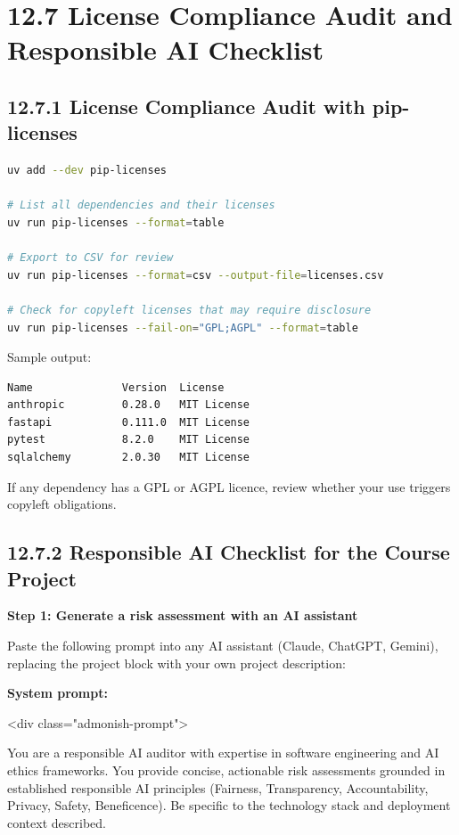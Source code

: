 \documentclass[11pt,a4paper]{book}
\begin{document}
\medskip

\section{12.7 License Compliance Audit and Responsible AI Checklist}

\subsection{12.7.1 License Compliance Audit with pip-licenses}

\begin{lstlisting}[language=Bash]
uv add --dev pip-licenses

# List all dependencies and their licenses
uv run pip-licenses --format=table

# Export to CSV for review
uv run pip-licenses --format=csv --output-file=licenses.csv

# Check for copyleft licenses that may require disclosure
uv run pip-licenses --fail-on="GPL;AGPL" --format=table
\end{lstlisting}

Sample output:
\begin{lstlisting}
Name              Version  License
anthropic         0.28.0   MIT License
fastapi           0.111.0  MIT License
pytest            8.2.0    MIT License
sqlalchemy        2.0.30   MIT License
\end{lstlisting}

If any dependency has a GPL or AGPL licence, review whether your use triggers copyleft obligations.

\subsection{12.7.2 Responsible AI Checklist for the Course Project}

\textbf{Step 1: Generate a risk assessment with an AI assistant}

Paste the following prompt into any AI assistant (Claude, ChatGPT, Gemini), replacing the project block with your own project description:

\textbf{System prompt:}

<div class="admonish-prompt">

You are a responsible AI auditor with expertise in software engineering and AI ethics
frameworks. You provide concise, actionable risk assessments grounded in established
responsible AI principles (Fairness, Transparency, Accountability, Privacy, Safety,
Beneficence). Be specific to the technology stack and deployment context described.
\end{document}
